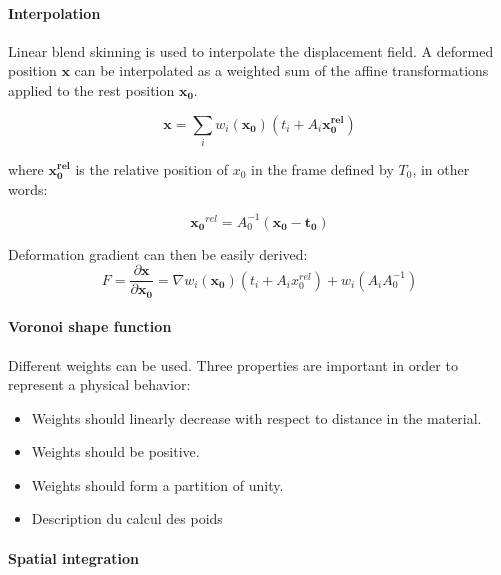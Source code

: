 \documentclass[11pt, oneside, a4paper]{memoir}
\begin{document}
\paragraph{Interpolation}
Linear blend skinning is used to interpolate the displacement field. A deformed position $\mathbf{x}$ can be interpolated as a weighted sum of the affine transformations applied to the rest position $\mathbf{x_{0}}$.

\begin{equation}
\mathbf{x} = \sum_{i} w_{i}(\mathbf{x_{0}})\left(t_{i}+A_{i}\mathbf{x_{0}^{rel}}\right)
\end{equation}

where $\mathbf{x_{0}^{rel}}$ is the relative position of $x_{0}$ in the frame defined by $T_{0}$, in other words:

\begin{equation}
\mathbf{x_{0}}^{rel} = A_{0}^{-1}\left( \mathbf{x_{0}} - \mathbf{t_{0}} \right)
\end{equation}

Deformation gradient can then be easily derived:
\begin{equation}
F = \frac{\partial \mathbf{x}}{\partial \mathbf{x_{0}}} =
\nabla w_{i}(\mathbf{x_{0}}) \left( t_{i}+A_{i}x_{0}^{rel}\right) + 
w_{i}\left( A_{i}A_{0}^{-1} \right)
\end{equation}

\paragraph{Voronoi shape function}

Different weights can be used. Three properties are important in order to represent a physical behavior:

\begin{itemize}
\item Weights should linearly decrease with respect to distance in the material.
\item Weights should be positive.
\item Weights should form a partition of unity.
\end{itemize}

\begin{itemize}
\item Description du calcul des poids
\end{itemize}

\paragraph{Spatial integration}
\end{document}
